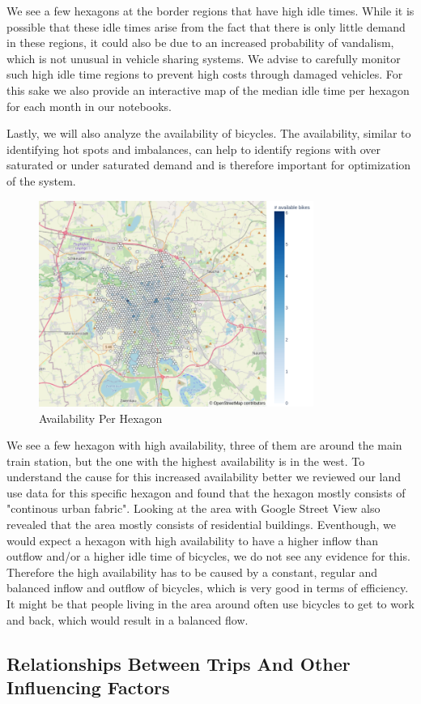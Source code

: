 We see a few hexagons at the border regions that have high idle times.
While it is possible that these idle times arise from the fact that there is only little demand in these regions, it could also be due to an increased probability of vandalism, which is not unusual in vehicle sharing systems.
We advise to carefully monitor such high idle time regions to prevent high costs through damaged vehicles.
For this sake we also provide an interactive map of the median idle time per hexagon for each month in our notebooks.

Lastly, we will also analyze the availability of bicycles. The availability,
similar to identifying hot spots and imbalances, can help to identify regions
with over saturated or under saturated demand and is therefore important for
optimization of the system.


\begin{figure}[htb]
    \centering
    \includegraphics[width=0.8\textwidth]{Figures/descriptive_analysis/availability_per_hexagon.png}
    \caption{Availability Per Hexagon}
    \label{fig:descriptive_analysis_availability_per_hexagon}
\end{figure}

We see a few hexagon with high availability, three of them are around the main
train station, but the one with the highest availability is in the west. To
understand the cause for this increased availability better we reviewed our
land use data for this specific hexagon and found that the hexagon mostly
consists of "continous urban fabric". Looking at the area with Google Street
View also revealed that the area mostly consists of residential buildings.
Eventhough, we would expect a hexagon with high availability to have a higher
inflow than outflow and/or a higher idle time of bicycles, we do not see any
evidence for this. Therefore the high availability has to be caused by a constant,
regular and balanced inflow and outflow of bicycles, which is very good in
terms of efficiency. It might be that people living in the area around often
use bicycles to get to work and back, which would result in a balanced flow.


\subsection{Relationships Between Trips And Other Influencing Factors}
\label{subsec:descriptive_analysis_relationships}
